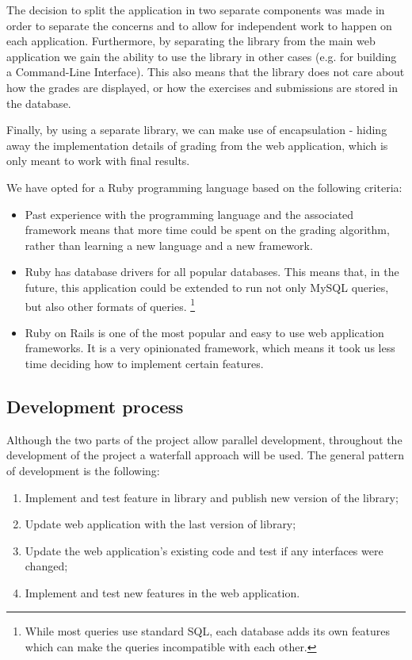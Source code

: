 The decision to split the application in two separate components was made in order to separate the concerns and to allow for independent work to happen on each application. Furthermore, by separating the library from the main web application we gain the ability to use the library in other cases (e.g. for building a Command-Line Interface). This also means that the library does not care about how the grades are displayed, or how the exercises and submissions are stored in the database.

Finally, by using a separate library, we can make use of encapsulation - hiding away the implementation details of grading from the web application, which is only meant to work with final results.

We have opted for a Ruby programming language based on the following criteria:

\begin{itemize}
    \item Past experience with the programming language and the associated framework means that more time could be spent on the grading algorithm, rather than learning a new language and a new framework.
    \item Ruby has database drivers for all popular databases. This means that, in the future, this application could be extended to run not only MySQL queries, but also other formats of queries. \footnote{While most queries use standard SQL, each database adds its own features which can make the queries incompatible with each other.}
    \item Ruby on Rails is one of the most popular and easy to use web application frameworks. It is a very opinionated framework, which means it took us less time deciding how to implement certain features.
\end{itemize}

\subsection{Development process} \label{ch:reqandspec:sec:spec:subsec:dev_process}

Although the two parts of the project allow parallel development, throughout the development of the project a waterfall approach will be used. The general pattern of development is the following:

\begin{enumerate}
  \item Implement and test feature in library and publish new version of the library;
  \item Update web application with the last version of library;
  \item Update the web application's existing code and test if any interfaces were changed;
  \item Implement and test new features in the web application.
\end{enumerate}

